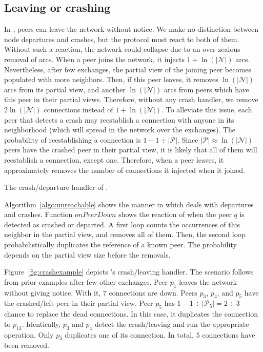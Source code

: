 \subsection{Leaving or crashing}
\label{subsec:leaving}

In \SPRAY, peers can leave the network without notice. We make no
distinction between node departures and crashes, but the protocol must
react to both of them. Without such a reaction, the network could
collapse due to an over zealous removal of arcs. When a peer joins the
network, it injects $1+\ln(|\mathcal{N}|)$ arcs. Nevertheless, after
few exchanges, the partial view of the joining peer becomes populated
with more neighbors. Then, if this peer leaves, it removes
$\ln(|\mathcal{N}|)$ arcs from its partial view, and another
$\ln(|\mathcal{N}|)$ arcs from peers which have this peer in their
partial views. Therefore, without any crash handler, we remove
$2\ln(|\mathcal{N}|)$ connections instead of
$1+\ln(|\mathcal{N}|)$. To alleviate this issue, each peer that
detects a crash may reestablish a connection with anyone in its
neighborhood (which will spread in the network over the
exchanges). The probability of reestablishing a connection is
$1-{1\div{|\mathcal{P}|}}$. Since ${|\mathcal{P}|}\approx
\ln(|\mathcal{N}|)$ peers have the crashed peer in their partial view,
it is likely that all of them will reestablish a connection, except
one. Therefore, when a peer leaves, it approximately removes the
number of connections it injected when it joined.

\begin{algorithm}[h]
  
  \caption{\label{algo:unreachable}The crash/departure handler of \SPRAY.}
\end{algorithm}

Algorithm~\ref{algo:unreachable} shows the manner in which \SPRAY deals with
departures and crashes.  Function $onPeerDown$ shows the reaction of \SPRAY
when the peer $q$ is detected as crashed or departed. A first loop counts the
occurrences of this neighbor in the partial view, and removes all of
them. Then, the second loop probabilistically duplicates the reference of a
known peer. The probability depends on the partial view size before the
removals.

Figure~\ref{fig:crashexample} depicts \SPRAY's crash/leaving handler. The
scenario follows from prior examples after few other exchanges. Peer $p_1$
leaves the network without giving notice. With it, $7$ connections are
down. Peers $p_3$, $p_4$, and $p_5$ have the crashed/left peer in their partial
view. Peer $p_5$ has $1-{1\div{|\mathcal{P}_5|}}={2\div{3}}$ chance to replace
the dead connections. In this case, it duplicates the connection to
$p_{13}$. Identically, $p_3$ and $p_4$ detect the crash/leaving and run the
appropriate operation. Only $p_3$ duplicates one of its connection. In total,
$5$ connections have been removed.

